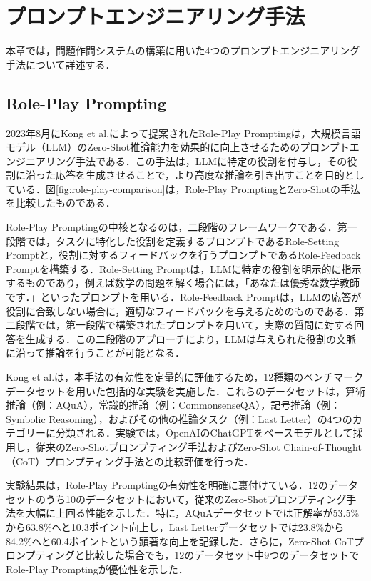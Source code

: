 \documentclass[11pt]{jreport}
\begin{document}
\chapter{プロンプトエンジニアリング手法}
本章では，問題作問システムの構築に用いた4つのプロンプトエンジニアリング手法について詳述する．
\section{Role-Play Prompting}
2023年8月にKong et al.\cite{Role_play}によって提案されたRole-Play Promptingは，大規模言語モデル（LLM）のZero-Shot推論能力を効果的に向上させるためのプロンプトエンジニアリング手法である．この手法は，LLMに特定の役割を付与し，その役割に沿った応答を生成させることで，より高度な推論を引き出すことを目的としている．図\ref{fig:role-play-comparison}は，Role-Play PromptingとZero-Shotの手法を比較したものである．

Role-Play Promptingの中核となるのは，二段階のフレームワークである．第一段階では，タスクに特化した役割を定義するプロンプトであるRole-Setting Promptと，役割に対するフィードバックを行うプロンプトであるRole-Feedback Promptを構築する．Role-Setting Promptは，LLMに特定の役割を明示的に指示するものであり，例えば数学の問題を解く場合には，「あなたは優秀な数学教師です．」といったプロンプトを用いる．Role-Feedback Promptは，LLMの応答が役割に合致しない場合に，適切なフィードバックを与えるためのものである．第二段階では，第一段階で構築されたプロンプトを用いて，実際の質問に対する回答を生成する．この二段階のアプローチにより，LLMは与えられた役割の文脈に沿って推論を行うことが可能となる．

Kong et al.は，本手法の有効性を定量的に評価するため，12種類のベンチマークデータセットを用いた包括的な実験を実施した．これらのデータセットは，算術推論（例：AQuA），常識的推論（例：CommonsenseQA），記号推論（例：Symbolic Reasoning），およびその他の推論タスク（例：Last Letter）の4つのカテゴリーに分類される．実験では，OpenAIのChatGPTをベースモデルとして採用し，従来のZero-Shotプロンプティング手法およびZero-Shot Chain-of-Thought（CoT）プロンプティング手法との比較評価を行った．

実験結果は，Role-Play Promptingの有効性を明確に裏付けている．12のデータセットのうち10のデータセットにおいて，従来のZero-Shotプロンプティング手法を大幅に上回る性能を示した．特に，AQuAデータセットでは正解率が53.5\%から63.8\%へと10.3ポイント向上し，Last Letterデータセットでは23.8\%から84.2\%へと60.4ポイントという顕著な向上を記録した．さらに，Zero-Shot CoTプロンプティングと比較した場合でも，12のデータセット中9つのデータセットでRole-Play Promptingが優位性を示した．
\end{document}
